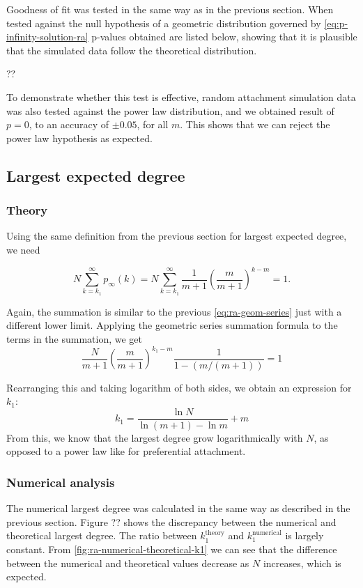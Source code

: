 Goodness of fit was tested in the same way as in the previous section. When tested against the null hypothesis of a geometric distribution governed by \autoref{eq:p-infinity-solution-ra} p-values obtained are listed below, showing that it is plausible that the simulated data follow the theoretical distribution. 
\begin{table}
	??
\end{table}

To demonstrate whether this test is effective, random attachment simulation data was also tested against the power law distribution, and we obtained result of $p = 0$, to an accuracy of $\pm 0.05$, for all $m$. This shows that we can reject the power law hypothesis as expected. 

\subsection{Largest expected degree}\label{subsection:largest-expected-degree}
\subsubsection{Theory}
Using the same definition from the previous section for largest expected degree, we need

\begin{equation}
	N \sum_{k=k_1}^\infty p_{\infty}(k) = N \sum_{k=k_1}^\infty \frac{1}{m+1} \left (\frac{m}{m+1} \right )^{k-m} = 1.
	\label{eq:largest-expected-degree-ra-criteria}
\end{equation}

Again, the summation is similar to the previous \autoref{eq:ra-geom-series} just with a different lower limit. Applying the geometric series summation formula to the terms in the summation, we get 
\begin{equation}
	\frac{N}{m+1} \left ( \frac{m}{m+1} \right )^{k_1 - m} \frac{1}{1 - (m / (m+1))} = 1
\end{equation}

Rearranging this and taking logarithm of both sides, we obtain an expression for $k_1$:
\begin{equation}
	k_1 = \frac{\ln N}{\ln (m+1) - \ln m} + m
	\label{eq:largest-degree-ra}
\end{equation}
From this, we know that the largest degree grow logarithmically with $N$, as opposed to a power law like for preferential attachment. 

\subsubsection{Numerical analysis}
The numerical largest degree was calculated in the same way as described in the previous section. Figure ?? shows the discrepancy between the numerical and theoretical largest degree. The ratio between $k_1^{\text{theory}}$ and $k_1^{\text{numerical}}$ is largely constant. From \autoref{fig:ra-numerical-theoretical-k1} we can see that the difference between the numerical and theoretical values decrease as $N$ increases, which is expected. 

